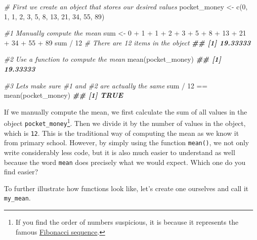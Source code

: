 \documentclass[
]{book}
\newenvironment{Shaded}{\begin{snugshade}}{\end{snugshade}}
\newcommand{\CommentTok}[1]{\textcolor[rgb]{0.56,0.35,0.01}{\textit{#1}}}
\newcommand{\DecValTok}[1]{\textcolor[rgb]{0.00,0.00,0.81}{#1}}
\newcommand{\DocumentationTok}[1]{\textcolor[rgb]{0.56,0.35,0.01}{\textbf{\textit{#1}}}}
\newcommand{\FunctionTok}[1]{\textcolor[rgb]{0.00,0.00,0.00}{#1}}
\newcommand{\NormalTok}[1]{#1}
\newcommand{\OtherTok}[1]{\textcolor[rgb]{0.56,0.35,0.01}{#1}}
\newcommand{\SpecialCharTok}[1]{\textcolor[rgb]{0.00,0.00,0.00}{#1}}
\begin{document}
\begin{Shaded}
\begin{Highlighting}[]
\CommentTok{\# First we create an object that stores our desired values}
\NormalTok{pocket\_money }\OtherTok{\textless{}{-}} \FunctionTok{c}\NormalTok{(}\DecValTok{0}\NormalTok{, }\DecValTok{1}\NormalTok{, }\DecValTok{1}\NormalTok{, }\DecValTok{2}\NormalTok{, }\DecValTok{3}\NormalTok{, }\DecValTok{5}\NormalTok{, }\DecValTok{8}\NormalTok{, }\DecValTok{13}\NormalTok{, }\DecValTok{21}\NormalTok{, }\DecValTok{34}\NormalTok{, }\DecValTok{55}\NormalTok{, }\DecValTok{89}\NormalTok{)}

\CommentTok{\#1 Manually compute the mean}
\NormalTok{sum }\OtherTok{\textless{}{-}} \DecValTok{0} \SpecialCharTok{+} \DecValTok{1} \SpecialCharTok{+} \DecValTok{1} \SpecialCharTok{+} \DecValTok{2} \SpecialCharTok{+} \DecValTok{3} \SpecialCharTok{+} \DecValTok{5} \SpecialCharTok{+} \DecValTok{8} \SpecialCharTok{+} \DecValTok{13} \SpecialCharTok{+} \DecValTok{21} \SpecialCharTok{+} \DecValTok{34} \SpecialCharTok{+} \DecValTok{55} \SpecialCharTok{+} \DecValTok{89}
\NormalTok{sum }\SpecialCharTok{/} \DecValTok{12} \CommentTok{\# There are 12 items in the object}
\DocumentationTok{\#\# [1] 19.33333}

\CommentTok{\#2 Use a function to compute the mean}
\FunctionTok{mean}\NormalTok{(pocket\_money)}
\DocumentationTok{\#\# [1] 19.33333}

\CommentTok{\#3 Let\textquotesingle{}s make sure \#1 and \#2 are actually the same}
\NormalTok{sum }\SpecialCharTok{/} \DecValTok{12} \SpecialCharTok{==} \FunctionTok{mean}\NormalTok{(pocket\_money)}
\DocumentationTok{\#\# [1] TRUE}
\end{Highlighting}
\end{Shaded}

If we manually compute the mean, we first calculate the sum of all values in the object \texttt{pocket\_money}\footnote{If you find the order of numbers suspicious, it is because it represents the famous \href{https://en.wikipedia.org/wiki/Fibonacci_number}{Fibonacci sequence}.}. Then we divide it by the number of values in the object, which is \texttt{12}. This is the traditional way of computing the mean as we know it from primary school. However, by simply using the function \texttt{mean()}, we not only write considerably less code, but it is also much easier to understand as well because the word \texttt{mean} does precisely what we would expect. Which one do you find easier?

To further illustrate how functions look like, let's create one ourselves and call it \texttt{my\_mean}.
\end{document}
